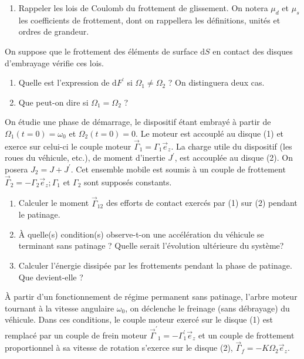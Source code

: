 \begin{enumerate}
\item Rappeler les lois de Coulomb du frottement de glissement. On notera $\mu_d$ et $\mu_s$ les coefficients de frottement, dont on rappellera les définitions, unités et ordres de grandeur.
\end{enumerate}

On suppose que le frottement des éléments de surface $\mathrm{d} S$ en contact des disques d'embrayage vérifie ces lois. 
\begin{enumerate}[resume]
\item Quelle est l'expression de $\mathrm{d} F^{\prime}$ si $\Omega_1 \neq \Omega_2$ ? On distinguera deux cas.
\item Que peut-on dire si $\Omega_1=\Omega_2$ ?
\end{enumerate}

On étudie une phase de démarrage, le dispositif étant embrayé à partir de $\Omega_1(t=0)=\omega_0$ et $\Omega_2(t=0)=0$. Le moteur est accouplé au disque (1) et exerce sur celui-ci le couple moteur $\vec{\Gamma}_1=\Gamma_1 \vec{e}_z$. La charge utile du dispositif (les roues du véhicule, etc.), de moment d'inertie $J^{\prime}$, est accouplée au disque (2). On posera $J_2=J+J^{\prime}$. Cet ensemble mobile est soumis à un couple de frottement $\vec{\Gamma}_2=-\Gamma_2 \vec{e}_z ; \Gamma_1$ et $\Gamma_2$ sont supposés constants.

\begin{enumerate}[resume]
\item Calculer le moment $\vec{\Gamma}_{12}$ des efforts de contact exercés par (1) sur (2) pendant le patinage.
\item À quelle(s) condition(s) observe-t-on une accélération du véhicule se terminant sans patinage ? Quelle serait l'évolution ultérieure du système?
\item Calculer l'énergie dissipée par les frottements pendant la phase de patinage. Que devient-elle ?
\end{enumerate}

À partir d'un fonctionnement de régime permanent sans patinage, l'arbre moteur tournant à la vitesse angulaire $\omega_0$, on déclenche le freinage (sans débrayage) du véhicule. Dans ces conditions, le couple moteur exercé sur le disque (1) est remplacé par un couple de frein moteur $\vec{\Gamma}^{\prime}{ }_1=-\Gamma_1^{\prime} \vec{e}_z$ et un couple de frottement proportionnel à sa vitesse de rotation s'exerce sur le disque (2), $\vec{\Gamma}_f=-K \Omega_2 \vec{e}_z$.

